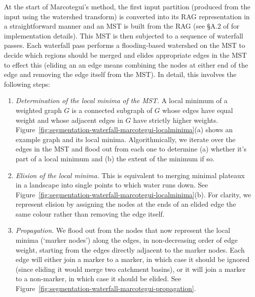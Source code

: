 \documentclass[a4paper]{article}
\begin{document}
At the start of Marcotegui's method, the first input partition (produced from the input using the watershed transform) is converted into its RAG representation in a straightforward manner and an MST is built from the RAG (see \S{}A.2 of \cite{golodetz11} for implementation details). This MST is then subjected to a sequence of waterfall passes. Each waterfall pass performs a flooding-based watershed on the MST to decide which regions should be merged and elides appropriate edges in the MST to effect this (eliding an an edge means combining the nodes at either end of the edge and removing the edge itself from the MST). In detail, this involves the following steps:
%
\begin{enumerate}

\item \emph{Determination of the local minima of the MST.} A local minimum of a weighted graph $G$ is a connected subgraph of $G$ whose edges have equal weight and whose adjacent edges in $G$ have strictly higher weights. Figure~\ref{fig:segmentation-waterfall-marcotegui-localminima}(a) shows an example graph and its local minima. Algorithmically, we iterate over the edges in the MST and flood out from each one to determine (a) whether it's part of a local minimum and (b) the extent of the minimum if so.

\item \emph{Elision of the local minima.} This is equivalent to merging minimal plateaux in a landscape into single points to which water runs down. See Figure~\ref{fig:segmentation-waterfall-marcotegui-localminima}(b). For clarity, we represent elision by assigning the nodes at the ends of an elided edge the same colour rather than removing the edge itself.

\item \emph{Propagation.} We flood out from the nodes that now represent the local minima (`marker nodes') along the edges, in non-decreasing order of edge weight, starting from the edges directly adjacent to the marker nodes. Each edge will either join a marker to a marker, in which case it should be ignored (since eliding it would merge two catchment basins), or it will join a marker to a non-marker, in which case it should be elided. See Figure~\ref{fig:segmentation-waterfall-marcotegui-propagation}.

\end{enumerate}
\end{document}
